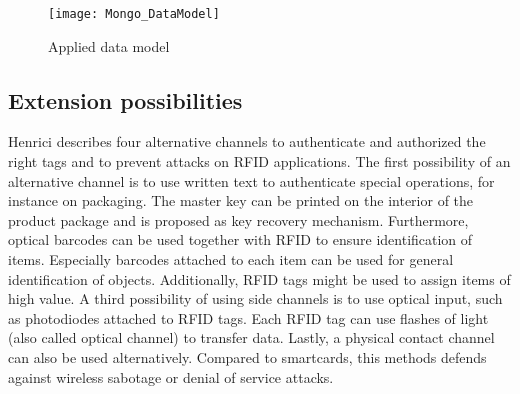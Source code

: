 \begin{figure}
\centering
\texttt{[image: Mongo\_DataModel]} 
\caption{\label{fig:datamodel}Applied data model} 
\end{figure}

\subsection{Extension possibilities}

Henrici \cite[p.121 ff.]{henrici} describes four alternative channels to authenticate and authorized the right tags and to prevent attacks on RFID applications. 
The first possibility of an alternative channel is to use written text to authenticate special operations, for instance on packaging. The master key can be printed on the interior of the product package and is proposed as key recovery mechanism.
Furthermore, optical barcodes can be used together with RFID to ensure identification of items. Especially barcodes attached to each item can be used for general identification of objects. Additionally, RFID tags might be used to assign items of high value.
A third possibility of using side channels is to use optical input, such as photodiodes attached to RFID tags. Each RFID tag can use flashes of light (also called optical channel) to transfer data.   
Lastly, a physical contact channel can also be used alternatively. Compared to smartcards, this methods defends against wireless sabotage or denial of service attacks.


















 
